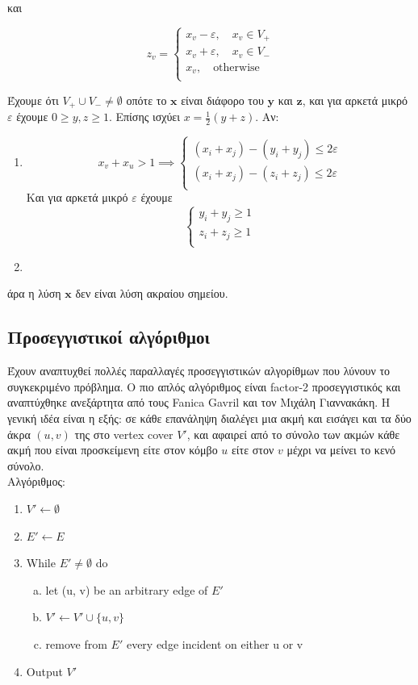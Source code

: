 και 

$$z_v = \begin{cases}
x_v - \varepsilon, \quad x_v \in V_{+}\\
x_v + \varepsilon, \quad x_v \in V_{-}\\
x_v , \quad \text{otherwise}\\
\end{cases}$$

Έχουμε ότι $V_{+}\cup V_{-} \neq \emptyset$ οπότε το $\boldsymbol{x}$ είναι διάφορο του $\boldsymbol{y}$ και $\boldsymbol{z}$, και για αρκετά μικρό $\varepsilon$
έχουμε $0 \geq y, z \geq 1$. Επίσης ισχύει $x = \frac{1}{2} (y + z)$.
Αν:
\begin{enumerate}
\item
$$x_v + x_u > 1 \implies 
\begin{cases}
(x_i + x_j) - (y_i + y_j) \leq 2\varepsilon\\
(x_i + x_j) - (z_i + z_j) \leq 2\varepsilon\\
\end{cases}
$$
\centering Και για αρκετά μικρό $\varepsilon$ έχουμε 
$$ 
\begin{cases}
y_i + y_j \geq 1\\
z_i + z_j \geq 1\\
\end{cases}
$$
\item


\end{enumerate}

άρα η λύση $\boldsymbol{x}$ δεν είναι λύση ακραίου σημείου.

\subsection{Προσεγγιστικοί αλγόριθμοι} 

Έχουν αναπτυχθεί πολλές παραλλαγές προσεγγιστικών αλγορίθμων που λύνουν το συγκεκριμένο πρόβλημα. Ο πιο απλός αλγόριθμος είναι factor-2  προσεγγιστικός και αναπτύχθηκε ανεξάρτητα από τους Fanica Gavril και τον Μιχάλη Γιαννακάκη. Η γενική ιδέα είναι η εξής: σε κάθε επανάληψη διαλέγει μια ακμή και εισάγει και τα δύο άκρα $(u, v)$ της στο vertex cover $V'$, και αφαιρεί από το σύνολο των ακμών κάθε ακμή που είναι προσκείμενη είτε στον κόμβο $u$ είτε στον $v$ μέχρι να μείνει το κενό σύνολο.\\
Αλγόριθμος:
\begin{enumerate}
\item $ V' \leftarrow \emptyset $
\item $ E' \leftarrow E$
\item While $ E' \neq {\emptyset} $ do
\begin{enumerate}[a)]
\item let (u, v) be an arbitrary edge of $E'$
\item $V' \leftarrow V' \cup \{u,v\}$
\item remove from $E'$ every edge incident on either u or v 
\end{enumerate}
\item Output $V'$
\end{enumerate}

